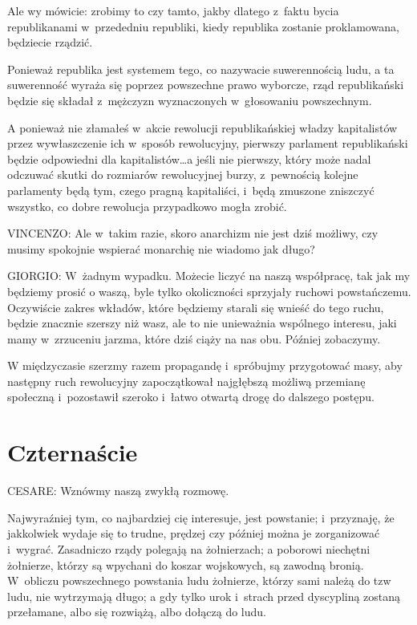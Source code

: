 \documentclass[oneside,polish,11pt,sfheadings]{mwbk}
\begin{document}
 
Ale wy mówicie: zrobimy to czy tamto, jakby dlatego z~faktu bycia republikanami w~przededniu republiki, kiedy republika
zostanie proklamowana, będziecie rządzić. 

 
Ponieważ republika jest systemem tego, co nazywacie suwerennością ludu, a ta suwerenność wyraża się poprzez powszechne
prawo wyborcze, rząd republikański będzie się składał z~mężczyzn wyznaczonych w~głosowaniu powszechnym. 

 
A ponieważ nie złamałeś w~akcie rewolucji republikańskiej władzy kapitalistów przez wywłaszczenie ich w~sposób
rewolucyjny, pierwszy parlament republikański będzie odpowiedni dla kapitalistów\ldots a jeśli nie pierwszy, który może
nadal odczuwać skutki do rozmiarów rewolucyjnej burzy, z~pewnością kolejne parlamenty będą tym, czego pragną
kapitaliści, i~będą zmuszone zniszczyć wszystko, co dobre rewolucja przypadkowo mogła zrobić. 




 
\noindent VINCENZO: Ale w~takim razie, skoro anarchizm nie jest dziś możliwy, czy musimy spokojnie wspierać monarchię nie wiadomo
jak długo? 




 
\noindent GIORGIO: W~żadnym wypadku. Możecie liczyć na naszą współpracę, tak jak my będziemy prosić o waszą, byle tylko
okoliczności sprzyjały ruchowi powstańczemu. Oczywiście zakres wkładów, które będziemy starali się wnieść do tego
ruchu, będzie znacznie szerszy niż wasz, ale to nie unieważnia wspólnego interesu, jaki mamy w~zrzuceniu jarzma, które
dziś ciąży na nas obu. Później zobaczymy. 

 
W międzyczasie szerzmy razem propagandę i~spróbujmy przygotować masy, aby następny ruch rewolucyjny zapoczątkował
najgłębszą możliwą przemianę społeczną i~pozostawił szeroko i~łatwo otwartą drogę do dalszego postępu. 










\chapter*{Czternaście}



 
\noindent CESARE: Wznówmy naszą zwykłą rozmowę. 

 
Najwyraźniej tym, co najbardziej cię interesuje, jest powstanie; i~przyznaję, że jakkolwiek wydaje się to trudne,
prędzej czy później można je zorganizować i~wygrać. Zasadniczo rządy polegają na żołnierzach; a poborowi niechętni
żołnierze, którzy są wpychani do koszar wojskowych, są zawodną bronią. W~obliczu powszechnego powstania ludu żołnierze,
którzy sami należą do tzw ludu, nie wytrzymają długo; a gdy tylko urok i~strach przed dyscypliną zostaną przełamane,
albo się rozwiążą, albo dołączą do ludu. 
\end{document}
